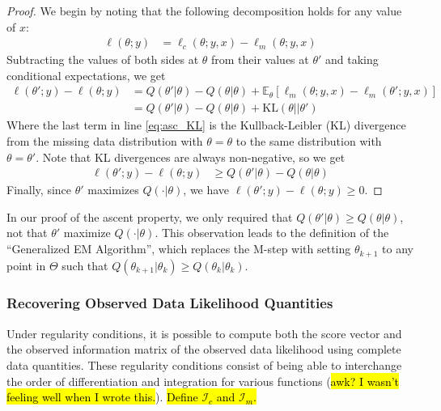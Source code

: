 \documentclass[11pt, oneside]{article}   	%
\newcommand{\bE}{\mathbb{E}}
\begin{document}
\begin{proof}
    We begin by noting that the following decomposition holds for any value of $x$:
    \begin{align}
        \ell(\theta; y) &= \ell_c(\theta; y, x) - \ell_m(\theta; y, x)
    \end{align}
    Subtracting the values of both sides at $\theta$ from their values at $\theta'$ and taking conditional expectations, we get
    \begin{align}
        \ell(\theta'; y) - \ell(\theta; y) &= Q(\theta'|\theta) - Q(\theta|\theta) + \bE_{\theta}[\ell_m(\theta; y, x) - \ell_m(\theta'; y, x)]\\
        &= Q(\theta'|\theta) - Q(\theta|\theta) + \mathrm{KL}(\theta || \theta') \label{eq:asc_KL}
    \end{align}
    Where the last term in line \ref{eq:asc_KL} is the Kullback-Leibler (KL) divergence from the missing data distribution with $\theta = \theta$ to the same distribution with $\theta = \theta'$. Note that KL divergences are always non-negative, so we get
    \begin{align}
    \ell(\theta'; y) - \ell(\theta; y) &\geq Q(\theta'|\theta) - Q(\theta|\theta)    
    \end{align}
    Finally, since $\theta'$ maximizes $Q(\cdot|\theta)$, we have $\ell(\theta'; y) - \ell(\theta; y) \geq 0$.
\end{proof}

In our proof of the ascent property, we only required that $Q(\theta'|\theta) \geq Q(\theta|\theta)$, not that $\theta'$ maximize $Q(\cdot|\theta)$. This observation leads to the definition of the ``Generalized EM Algorithm'', which replaces the M-step with setting $\theta_{k+1}$ to any point in $\Theta$ such that $Q(\theta_{k+1}|\theta_k) \geq Q(\theta_k|\theta_k)$.



\subsubsection{Recovering Observed Data Likelihood Quantities}

Under regularity conditions, it is possible to compute both the score vector and the observed information matrix of the observed data likelihood using complete data quantities. These regularity conditions consist of being able to interchange the order of differentiation and integration for various functions (\hl{awk? I wasn't feeling well when I wrote this.}). \hl{Define $\mathcal{I}_c$ and $\mathcal{I}_m$.}
\end{document}
